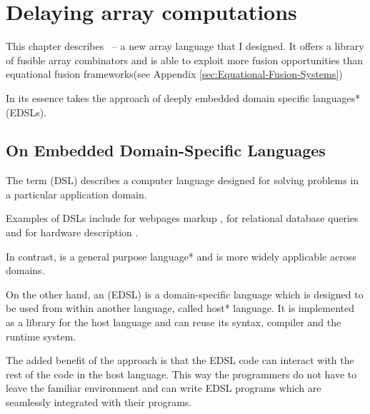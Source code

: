 \documentclass[preamble.tex]{subfiles}
\begin{document}
\clearpage

\chapter{Delaying array computations}
\label{ch:frontend}

This chapter describes \LiveFusion\ -- a new array language that I designed. It offers a library of fusible array combinators and is able to exploit more fusion opportunities than equational fusion frameworks\ieqf (see Appendix \ref{sec:Equational-Fusion-Systems})

In its essence \LiveFusion takes the approach of \*deeply embedded domain specific languages* (EDSLs).\iedsl


\section{On Embedded Domain-Specific Languages}
\iedsl

The term  (DSL) describes a computer language designed for solving problems in a particular application domain.

Examples of DSLs include  for webpages markup \cite{HTML},  for relational database queries \cite{SQL} and  for hardware description \cite{Verilog}.

In contrast, \Haskell \cite{Pey03} is a \*general purpose language* and is more widely applicable across domains.

On the other hand, an  (EDSL) is a domain-specific language which is designed to be used from within another language, called \*host* language. It is implemented as a library for the host language and can reuse its syntax, compiler and the runtime system.

The added benefit of the approach is that the EDSL code can interact with the rest of the code in the host language. This way the programmers do not have to leave the familiar environment and can write EDSL programs which are seamlessly integrated with their programs.
\end{document}
